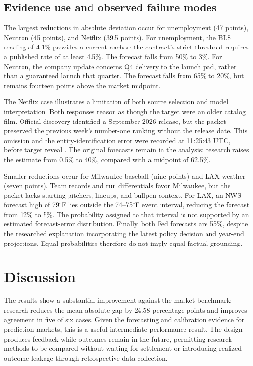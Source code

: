\documentclass[11pt,letterpaper]{article}
\begin{document}
\FloatBarrier
\subsection{Evidence use and observed failure modes}
The largest reductions in absolute deviation occur for unemployment (47
points), Neutron (45 points), and Netflix (39.5 points). For unemployment,
the BLS reading of 4.1\% provides a current anchor: the contract's strict
threshold requires a published rate of at least 4.5\%. The forecast falls
from 50\% to 3\%. For Neutron, the company update concerns Q4 delivery to the
launch pad, rather than a guaranteed launch that quarter. The forecast falls
from 65\% to 20\%, but remains fourteen points above the market midpoint.

The Netflix case illustrates a limitation of both source selection and model
interpretation. Both responses reason as though the target were an older
catalog film. Official discovery identified a September 2026 release, but
the packet preserved the previous week's number-one ranking without the
release date. This omission and the entity-identification error were recorded
at 11:25:43 UTC, before target reveal \cite{audit}. The original forecasts
remain in the analysis: research raises the estimate from 0.5\% to 40\%,
compared with a midpoint of 62.5\%.

Smaller reductions occur for Milwaukee baseball (nine points) and LAX
weather (seven points). Team records and run differentials favor Milwaukee,
but the packet lacks starting pitchers, lineups, and bullpen context. For
LAX, an NWS forecast high of 79$^\circ$F lies outside the 74--75$^\circ$F event
interval, reducing the forecast from 12\% to 5\%. The probability assigned to
that interval is not supported by an estimated forecast-error distribution.
Finally, both Fed forecasts are 55\%, despite the researched explanation
incorporating the latest policy decision and year-end projections. Equal
probabilities therefore do not imply equal factual grounding.
\FloatBarrier

\section{Discussion}
The results show a substantial improvement against the market benchmark:
research reduces the mean absolute gap by 24.58 percentage points and improves
agreement in five of six cases. Given the forecasting and calibration evidence
for prediction markets, this is a useful intermediate performance result.
The design produces feedback while outcomes remain in the future, permitting
research methods to be compared without waiting for settlement or introducing
realized-outcome leakage through retrospective data collection.
\end{document}
